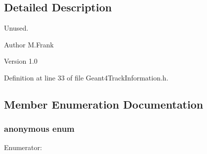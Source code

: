 \subsection{Detailed Description}
Unused. \begin{DoxyAuthor}{Author}
M.Frank 
\end{DoxyAuthor}
\begin{DoxyVersion}{Version}
1.0 
\end{DoxyVersion}


Definition at line 33 of file Geant4TrackInformation.h.

\subsection{Member Enumeration Documentation}
\hypertarget{class_d_d4hep_1_1_simulation_1_1_geant4_track_information_afa005d7916d394b13aeaee68fd11eb39}{
\subsubsection[{"@11}]{\setlength{\rightskip}{0pt plus 5cm}anonymous enum}}
\label{class_d_d4hep_1_1_simulation_1_1_geant4_track_information_afa005d7916d394b13aeaee68fd11eb39}
\begin{Desc}
\item[Enumerator: ]\par
\begin{description}
\item[{\em 
\hypertarget{class_d_d4hep_1_1_simulation_1_1_geant4_track_information_afa005d7916d394b13aeaee68fd11eb39ae708756d2130a012dfbf610b5a185013}{
STORE}
\label{class_d_d4hep_1_1_simulation_1_1_geant4_track_information_afa005d7916d394b13aeaee68fd11eb39ae708756d2130a012dfbf610b5a185013}
}]\item[{\em 
\hypertarget{class_d_d4hep_1_1_simulation_1_1_geant4_track_information_afa005d7916d394b13aeaee68fd11eb39a81ac210b79462efbc46ab716df41e891}{
LAST}
\label{class_d_d4hep_1_1_simulation_1_1_geant4_track_information_afa005d7916d394b13aeaee68fd11eb39a81ac210b79462efbc46ab716df41e891}
}]\end{description}
\end{Desc}



